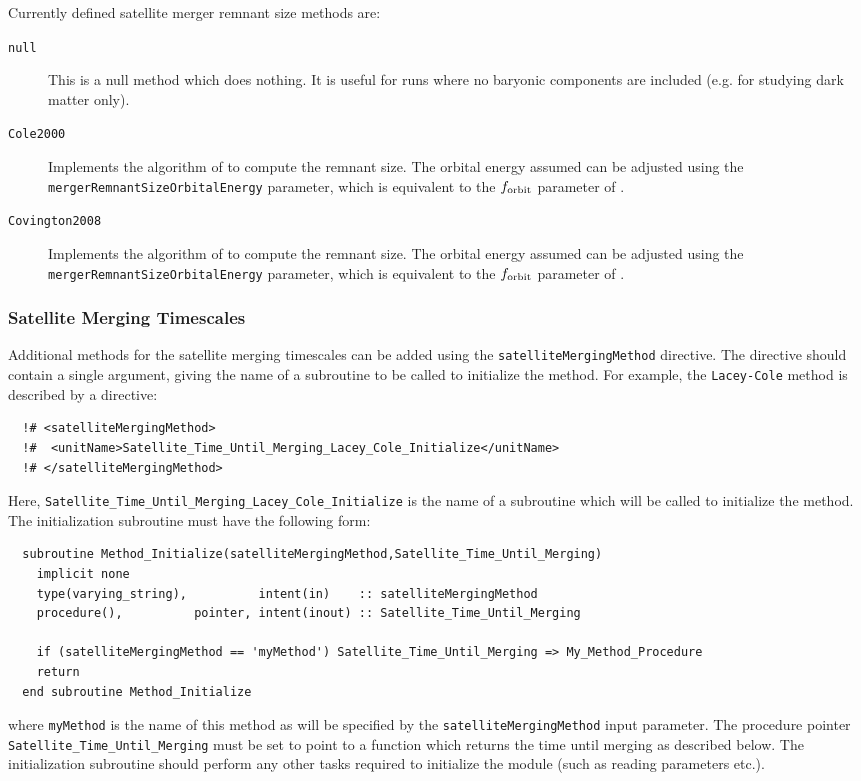 Currently defined satellite merger remnant size methods are:
\begin{description}
 \item [{\tt null}] This is a null method which does nothing. It is useful for runs where no baryonic components are included (e.g. for studying dark matter only).
 \item [{\tt Cole2000}] Implements the algorithm of \cite{cole_hierarchical_2000} to compute the remnant size. The orbital energy assumed can be adjusted using the {\tt mergerRemnantSizeOrbitalEnergy} parameter, which is equivalent to the $f_{\rm orbit}$ parameter of \cite{cole_hierarchical_2000}.
 \item [{\tt Covington2008}] Implements the algorithm of \cite{covington_predicting_2008} to compute the remnant size. The orbital energy assumed can be adjusted using the {\tt mergerRemnantSizeOrbitalEnergy} parameter, which is equivalent to the $f_{\rm orbit}$ parameter of \cite{cole_hierarchical_2000}.
\end{description}

\subsubsection{Satellite Merging Timescales}

Additional methods for the satellite merging timescales can be added using the {\tt satelliteMergingMethod} directive. The directive should contain a single argument, giving the name of a subroutine to be called to initialize the method. For example, the {\tt Lacey-Cole} method is described by a directive:
\begin{verbatim}
  !# <satelliteMergingMethod>
  !#  <unitName>Satellite_Time_Until_Merging_Lacey_Cole_Initialize</unitName>
  !# </satelliteMergingMethod>
\end{verbatim}
Here, {\tt Satellite\_Time\_Until\_Merging\_Lacey\_Cole\_Initialize} is the name of a subroutine which will be called to initialize the method. The initialization subroutine must have the following form:
\begin{verbatim}
  subroutine Method_Initialize(satelliteMergingMethod,Satellite_Time_Until_Merging)
    implicit none
    type(varying_string),          intent(in)    :: satelliteMergingMethod
    procedure(),          pointer, intent(inout) :: Satellite_Time_Until_Merging
    
    if (satelliteMergingMethod == 'myMethod') Satellite_Time_Until_Merging => My_Method_Procedure
    return
  end subroutine Method_Initialize
\end{verbatim}
where {\tt myMethod} is the name of this method as will be specified by the {\tt satelliteMergingMethod} input parameter. The procedure pointer {\tt Satellite\_Time\_Until\_Merging} must be set to point to a function which returns the time until merging as described below. The initialization subroutine should perform any other tasks required to initialize the module (such as reading parameters etc.).


